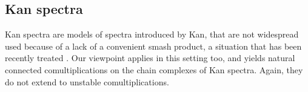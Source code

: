 






\subsection{Kan spectra} Kan spectra \cite{Kan1963} are models of spectra introduced by Kan, that are not widespread used because of a lack of a convenient smash product, a situation that has been recently treated \cite{CKP2023}. Our viewpoint applies in this setting too, and yields natural connected comultiplications on the chain complexes of Kan spectra. Again, they do not extend to unstable comultiplications.

